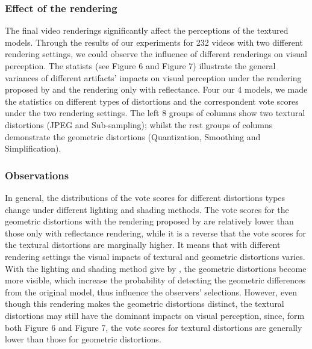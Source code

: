 \subsubsection{Effect of the rendering}
The final video renderings significantly affect the perceptions of the textured models. Through the results of our experiments for 232 videos with two different rendering settings, we could observe the influence of different renderings on visual perception. The statists (see Figure 6 and Figure 7) illustrate the general variances of different artifacts’ impacts on visual perception under the rendering proposed by \cite{Rogowitz_2001} and the rendering only with reflectance. Four our 4 models, we made the statistics on different types of distortions and the correspondent vote scores under the two rendering settings. The left 8 groups of columns show two textural distortions (JPEG and Sub-sampling); whilst the rest groups of columns demonstrate the geometric distortions (Quantization, Smoothing and Simplification).

\subsubsection{Observations}
In general, the distributions of the vote scores for different distortions types change under different lighting and shading methods. The vote scores for the geometric distortions with the rendering proposed by \cite{Rogowitz_2001} are relatively lower than those only with reflectance rendering, while it is a reverse that the vote scores for the textural distortions are marginally higher. It means that with different rendering settings the visual impacts of textural and geometric distortions varies. With the lighting and shading method give by \cite{Rogowitz_2001}, the geometric distortions become more visible, which increase the probability of detecting the geometric differences from the original model, thus influence the observers’ selections. However, even though this rendering makes the geometric distortions distinct, the textural distortions may still have the dominant impacts on visual perception, since, form both Figure 6 and Figure 7, the vote scores for textural distortions are generally lower than those for geometric distortions.